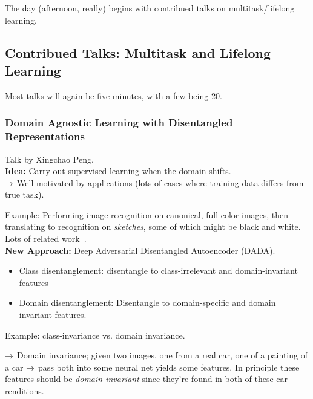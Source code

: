 
The day (afternoon, really) begins with contribued talks on multitask/lifelong learning.

\subsection{Contribued Talks: Multitask and Lifelong Learning}

Most talks will again be five minutes, with a few being 20. 

\subsubsection{Domain Agnostic Learning with Disentangled Representations~\cite{peng2019domain}}

Talk by Xingchao Peng. \\

{\bf Idea:} Carry out supervised learning when the domain shifts. \\
$\rightarrow$ Well motivated by applications (lots of cases where training data differs from true task).


Example: Performing image recognition on canonical, full color images, then translating to recognition on {\it sketches}, some of which might be black and white. \\

Lots of related work~\cite{saito2018maximum,ganin2016domain,tzeng2017adversarial}. \\

{\bf New Approach:} Deep Adversarial Disentangled Autoencoder (DADA).
\begin{itemize}
    \item Class disentanglement: disentangle to class-irrelevant and domain-invariant features
    \item Domain disentanglement: Disentangle to domain-specific and domain invariant features.
\end{itemize}

Example: class-invariance vs. domain invariance.

$\rightarrow$ Domain invariance; given two images, one from a real car, one of a painting of a car $\rightarrow$ pass both into some neural net yields some features. In principle these features should be {\it domain-invariant} since they're found in both of these car renditions. \\

